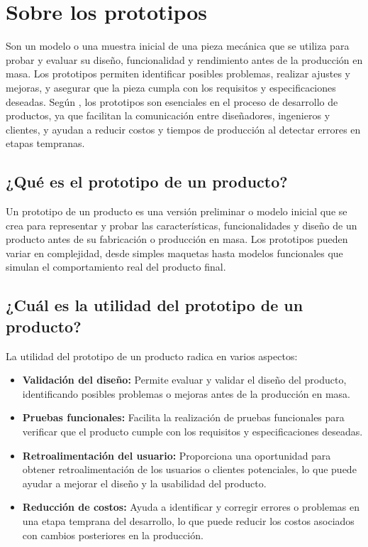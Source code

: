 \section{Sobre los prototipos}

  Son un modelo o una muestra inicial de una pieza mecánica que se utiliza para probar y evaluar su diseño, funcionalidad y rendimiento antes de la producción en masa. Los prototipos permiten identificar posibles problemas, realizar ajustes y mejoras, y asegurar que la pieza cumpla con los requisitos y especificaciones deseadas. Según \cite{Christie2012}, los prototipos son esenciales en el proceso de desarrollo de productos, ya que facilitan la comunicación entre diseñadores, ingenieros y clientes, y ayudan a reducir costos y tiempos de producción al detectar errores en etapas tempranas.

  \subsection{¿Qué es el prototipo de un producto?}

  Un prototipo de un producto es una versión preliminar o modelo inicial que se crea para representar y probar las características, funcionalidades y diseño de un producto antes de su fabricación o producción en masa. Los prototipos pueden variar en complejidad, desde simples maquetas hasta modelos funcionales que simulan el comportamiento real del producto final.

  \subsection{¿Cuál es la utilidad del prototipo de un producto?}

  La utilidad del prototipo de un producto radica en varios aspectos:

  \begin{itemize}
    \item \textbf{Validación del diseño:} Permite evaluar y validar el diseño del producto, identificando posibles problemas o mejoras antes de la producción en masa.
    \item \textbf{Pruebas funcionales:} Facilita la realización de pruebas funcionales para verificar que el producto cumple con los requisitos y especificaciones deseadas.
    \item \textbf{Retroalimentación del usuario:} Proporciona una oportunidad para obtener retroalimentación de los usuarios o clientes potenciales, lo que puede ayudar a mejorar el diseño y la usabilidad del producto.
    \item \textbf{Reducción de costos:} Ayuda a identificar y corregir errores o problemas en una etapa temprana del desarrollo, lo que puede reducir los costos asociados con cambios posteriores en la producción.
  \end{itemize}

